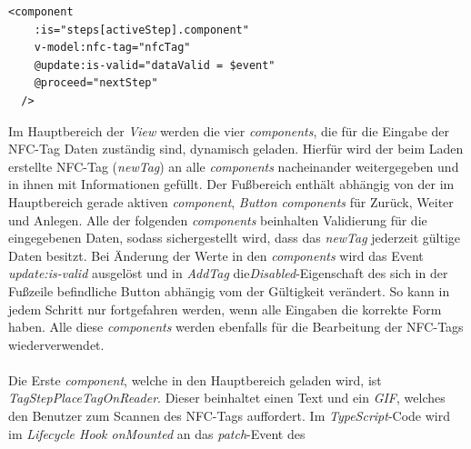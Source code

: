 \documentclass[10pt, a4paper]{article}
\begin{document}
\begin{lstlisting}[caption={Dynamisches Laden der components von AddTag}, captionpos=b]
  <component
    :is="steps[activeStep].component"
    v-model:nfc-tag="nfcTag"
    @update:is-valid="dataValid = $event"
    @proceed="nextStep"
  />
\end{lstlisting}

Im Hauptbereich der \textit{View} werden die vier \textit{components}, die für die Eingabe der NFC-Tag Daten zuständig sind, dynamisch geladen.
Hierfür wird der beim Laden erstellte NFC-Tag (\textit{newTag}) an alle \textit{components} nacheinander weitergegeben und in ihnen mit Informationen gefüllt.
Der Fußbereich enthält abhängig von der im Hauptbereich gerade aktiven \textit{component}, \textit{Button components} für \glqq Zurück\grqq{}, \glqq Weiter\grqq{} und
\glqq Anlegen\grqq.
Alle der folgenden \textit{components} beinhalten Validierung für die eingegebenen Daten, sodass sichergestellt wird, dass das \textit{newTag} jederzeit gültige Daten besitzt.
Bei Änderung der Werte in den \textit{components} wird das Event \textit{update:is-valid} ausgelöst und in \textit{AddTag} die\textit{Disabled}-Eigenschaft des sich in der Fußzeile befindliche Button abhängig vom der Gültigkeit verändert.
So kann in jedem Schritt nur fortgefahren werden, wenn alle Eingaben die korrekte Form haben.
Alle diese \textit{components} werden ebenfalls für die Bearbeitung der NFC-Tags wiederverwendet.
\\~\\
Die Erste \textit{component}, welche in den Hauptbereich geladen wird, ist \textit{TagStepPlaceTagOnReader}. Dieser beinhaltet einen Text und ein \textit{GIF},
welches den Benutzer zum Scannen des NFC-Tags auffordert. Im \textit{TypeScript}-Code wird im \textit{Lifecycle Hook onMounted} an das \textit{patch}-Event des
\end{document}

